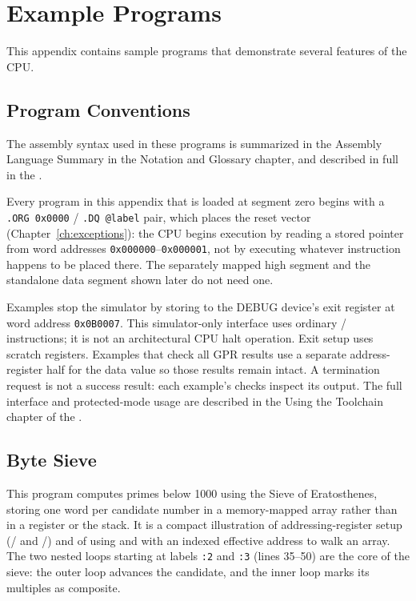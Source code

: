 \chapter{Example Programs}
\label{appendix:example-programs}

This appendix contains sample programs that demonstrate several features of the CPU.

\section{Program Conventions}

The assembly syntax used in these programs is summarized in the Assembly Language Summary in the Notation and Glossary
chapter, and described in full in the \asmmanual{}.

Every program in this appendix that is loaded at segment zero begins with a \texttt{.ORG 0x0000} / \texttt{.DQ @label}
pair, which places the reset vector (Chapter~\ref{ch:exceptions}): the CPU begins execution by reading a stored pointer
from word addresses \texttt{0x000000}--\texttt{0x000001}, not by executing whatever instruction happens to be placed
there. The separately mapped high segment and the standalone data segment shown later do not need one.

Examples stop the simulator by storing  to the DEBUG device's exit register at word address \texttt{0x0B0007}.
This simulator-only interface uses ordinary / instructions; it is not an architectural
CPU halt operation. Exit setup uses scratch registers. Examples that check all GPR results use a separate
address-register half for the data value so those results remain intact. A termination request is not a success result:
each example's checks inspect its output. The full interface and protected-mode usage are described in the Using the
Toolchain chapter of the \asmmanual{}.

\section{Byte Sieve}

This program computes primes below 1000 using the Sieve of Eratosthenes, storing one word per candidate number in a
memory-mapped array rather than in a register or the stack. It is a compact illustration of addressing-register setup
(/ and /) and of using  and  with an indexed effective
address to walk an array. The two nested loops starting at labels \texttt{:2} and \texttt{:3} (lines 35--50) are the
core of the sieve: the outer loop advances the candidate, and the inner loop marks its multiples as composite.

